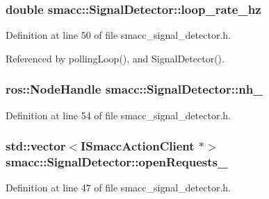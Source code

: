 \subsubsection[{\texorpdfstring{loop\+\_\+rate\+\_\+hz}{loop_rate_hz}}]{\setlength{\rightskip}{0pt plus 5cm}double smacc\+::\+Signal\+Detector\+::loop\+\_\+rate\+\_\+hz\hspace{0.3cm}{\ttfamily [private]}}\hypertarget{classsmacc_1_1SignalDetector_a41a2ae4262ed350f46d8b886bdc1dfa5}{}\label{classsmacc_1_1SignalDetector_a41a2ae4262ed350f46d8b886bdc1dfa5}


Definition at line 50 of file smacc\+\_\+signal\+\_\+detector.\+h.



Referenced by polling\+Loop(), and Signal\+Detector().

\subsubsection[{\texorpdfstring{nh\+\_\+}{nh_}}]{\setlength{\rightskip}{0pt plus 5cm}ros\+::\+Node\+Handle smacc\+::\+Signal\+Detector\+::nh\+\_\+\hspace{0.3cm}{\ttfamily [private]}}\hypertarget{classsmacc_1_1SignalDetector_a5c416677fd537afc79f2fbc2e68b2dee}{}\label{classsmacc_1_1SignalDetector_a5c416677fd537afc79f2fbc2e68b2dee}


Definition at line 54 of file smacc\+\_\+signal\+\_\+detector.\+h.

\subsubsection[{\texorpdfstring{open\+Requests\+\_\+}{openRequests_}}]{\setlength{\rightskip}{0pt plus 5cm}std\+::vector$<${\bf I\+Smacc\+Action\+Client} $\ast$$>$ smacc\+::\+Signal\+Detector\+::open\+Requests\+\_\+\hspace{0.3cm}{\ttfamily [private]}}\hypertarget{classsmacc_1_1SignalDetector_ac1b45dada88384ad38a12eea2d53205a}{}\label{classsmacc_1_1SignalDetector_ac1b45dada88384ad38a12eea2d53205a}


Definition at line 47 of file smacc\+\_\+signal\+\_\+detector.\+h.

